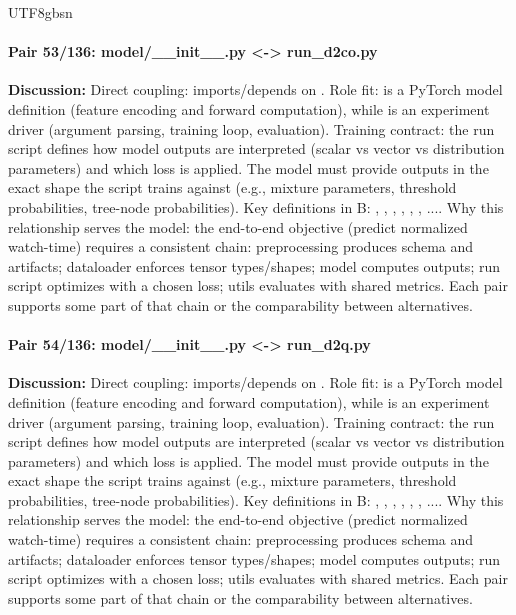 \documentclass[11pt]{article}
\begin{document}
\begin{CJK*}{UTF8}{gbsn}
\paragraph{Pair 53/136: model/\_\_init\_\_.py <-> run\_d2co.py}
\textbf{Discussion:} Direct coupling: \texttt{} imports/depends on \texttt{}. Role fit: \texttt{} is a PyTorch model definition (feature encoding and forward computation), while \texttt{} is an experiment driver (argument parsing, training loop, evaluation). Training contract: the run script defines how model outputs are interpreted (scalar vs vector vs distribution parameters) and which loss is applied. The model must provide outputs in the exact shape the script trains against (e.g., mixture parameters, threshold probabilities, tree-node probabilities). Key definitions in B: \texttt{}, \texttt{}, \texttt{}, \texttt{}, \texttt{}, \texttt{}, .... Why this relationship serves the model: the end-to-end objective (predict normalized watch-time) requires a consistent chain: preprocessing produces schema and artifacts; dataloader enforces tensor types/shapes; model computes outputs; run script optimizes with a chosen loss; utils evaluates with shared metrics. Each pair supports some part of that chain or the comparability between alternatives.

\paragraph{Pair 54/136: model/\_\_init\_\_.py <-> run\_d2q.py}
\textbf{Discussion:} Direct coupling: \texttt{} imports/depends on \texttt{}. Role fit: \texttt{} is a PyTorch model definition (feature encoding and forward computation), while \texttt{} is an experiment driver (argument parsing, training loop, evaluation). Training contract: the run script defines how model outputs are interpreted (scalar vs vector vs distribution parameters) and which loss is applied. The model must provide outputs in the exact shape the script trains against (e.g., mixture parameters, threshold probabilities, tree-node probabilities). Key definitions in B: \texttt{}, \texttt{}, \texttt{}, \texttt{}, \texttt{}, \texttt{}, .... Why this relationship serves the model: the end-to-end objective (predict normalized watch-time) requires a consistent chain: preprocessing produces schema and artifacts; dataloader enforces tensor types/shapes; model computes outputs; run script optimizes with a chosen loss; utils evaluates with shared metrics. Each pair supports some part of that chain or the comparability between alternatives.


\end{CJK*}
\end{document}
